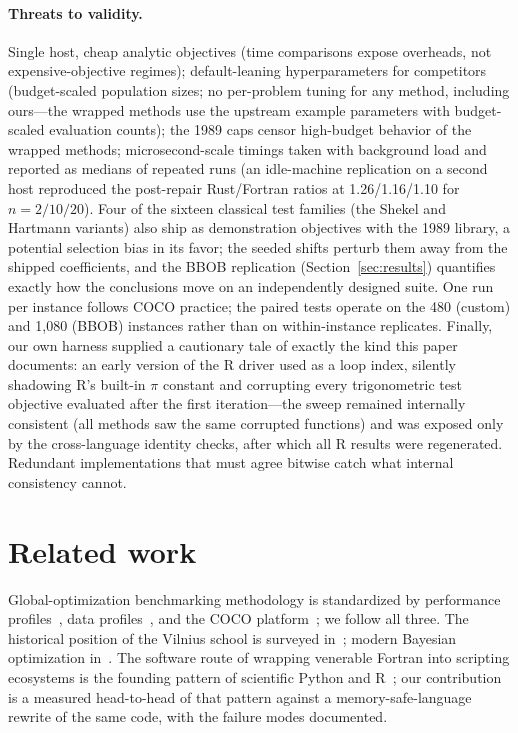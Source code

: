 \paragraph{Threats to validity.} Single host, cheap analytic
objectives (time comparisons expose overheads, not expensive-objective
regimes); default-leaning hyperparameters for competitors (budget-scaled
population sizes; no per-problem tuning for any method, including
ours---the wrapped methods use the upstream example parameters with
budget-scaled evaluation counts); the 1989 caps censor high-budget
behavior of the wrapped methods; microsecond-scale timings taken with
background load and reported as medians of repeated runs (an
idle-machine replication on a second host reproduced the post-repair
Rust/Fortran ratios at 1.26/1.16/1.10 for $n=2/10/20$). Four of the
sixteen classical test families (the Shekel and Hartmann variants)
also ship as demonstration objectives with the 1989 library, a
potential selection bias in its favor; the seeded shifts perturb them
away from the shipped coefficients, and the BBOB replication
(Section~\ref{sec:results}) quantifies exactly how the conclusions
move on an independently designed suite. One run per instance follows
COCO practice; the paired tests operate on the 480 (custom) and
1{,}080 (BBOB) instances rather than on within-instance replicates.
Finally, our own harness supplied a cautionary tale of exactly the kind
this paper documents: an early version of the R driver used 
as a loop index, silently shadowing R's built-in $\pi$ constant and
corrupting every trigonometric test objective evaluated after the first
iteration---the sweep remained internally consistent (all methods saw
the same corrupted functions) and was exposed only by the
cross-language identity checks, after which all R results were
regenerated. Redundant implementations that must agree bitwise catch
what internal consistency cannot.

\section{Related work}
\label{sec:related}

Global-optimization benchmarking methodology is standardized by
performance profiles~\cite{dolan2002benchmarking}, data
profiles~\cite{more2009benchmarking}, and the COCO
platform~\cite{hansen2021coco}; we follow all three. The historical
position of the Vilnius school is surveyed
in~\cite{torn1989global,zilinskas2016stochastic}; modern Bayesian
optimization in~\cite{shahriari2016taking,frazier2018tutorial}. The
software route of wrapping venerable Fortran into scripting ecosystems
is the founding pattern of scientific Python and
R~\cite{virtanen2020scipy,chambers2008software}; our contribution is a
measured head-to-head of that pattern against a memory-safe-language
rewrite of the same code, with the failure modes documented.

